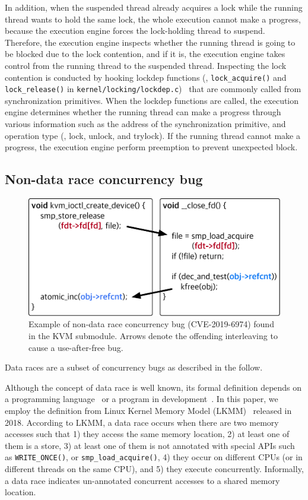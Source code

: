 In addition, when the suspended thread already acquires a lock while
the running thread wants to hold the same lock, the whole execution
cannot make a progress, because the execution engine forces the
lock-holding thread to suspend.
%
Therefore, the execution engine inspects whether the running thread is
going to be blocked due to the lock contention, and if it is, the
execution engine takes control from the running thread to the
suspended thread.
%
Inspecting the lock contention is conducted by hooking lockdep
functions (\ie, \texttt{lock_acquire()} and \texttt{lock_release()} in
\texttt{kernel/locking/lockdep.c})~\cite{lockdep} that are commonly
called from synchronization primitives.
%
When the lockdep functions are called, the execution engine determines
whether the running thread can make a progress through various
information such as the address of the synchronization primitive, and
operation type (\ie, lock, unlock, and trylock).
%
If the running thread cannot make a progress, the execution engine
perform preemption to prevent unexpected block.

\subsection{Non-data race concurrency bug}
\label{s:appendix:datarace}

\begin{figure}[h]
  \centering
  \includegraphics[width=0.85\linewidth]{fig/racecondition.pdf}
  \caption{Example of non-data race concurrency bug (CVE-2019-6974)
    found in the KVM submodule. Arrows denote the offending
    interleaving to cause a use-after-free bug.}
  \label{fig:concurrencybugs}
\end{figure}

Data races are a subset of concurrency bugs as described in the
follow.

%
Although the concept of data race is well known, its formal definition
depends on a programming language~\cite{C-standard-n2310,
  java-standard} or a program in development~\cite{lkmm}. In this
paper, we employ the definition from Linux Kernel Memory Model
(LKMM)~\cite{lkmm} released in 2018. According to LKMM, a data race
occurs when there are two memory accesses such that 1) they access the
same memory location, 2) at least one of them is a store, 3) at least
one of them is not annotated with special APIs such as
\texttt{WRITE_ONCE()}, or \texttt{smp_load_acquire()}, 4) they occur
on different CPUs (or in different threads on the same CPU), and 5)
they execute concurrently.
%
Informally, a data race indicates un-annotated concurrent accesses to
a shared memory location.

